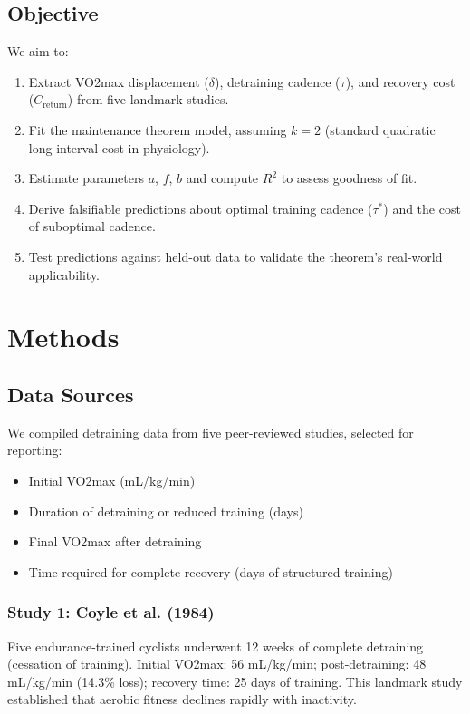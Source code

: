 \documentclass[12pt,a4paper]{article}
\begin{document}
\subsection{Objective}

We aim to:
\begin{enumerate}
\item Extract VO2max displacement ($\delta$), detraining cadence ($\tau$), and recovery cost ($C_{\text{return}}$) from five landmark studies.
\item Fit the maintenance theorem model, assuming $k=2$ (standard quadratic long-interval cost in physiology).
\item Estimate parameters $a$, $f$, $b$ and compute $R^2$ to assess goodness of fit.
\item Derive falsifiable predictions about optimal training cadence ($\tau^*$) and the cost of suboptimal cadence.
\item Test predictions against held-out data to validate the theorem's real-world applicability.
\end{enumerate}

\section{Methods}

\subsection{Data Sources}

We compiled detraining data from five peer-reviewed studies, selected for reporting:
\begin{itemize}
\item Initial VO2max (mL/kg/min)
\item Duration of detraining or reduced training (days)
\item Final VO2max after detraining
\item Time required for complete recovery (days of structured training)
\end{itemize}

\subsubsection{Study 1: Coyle et al. (1984)}
Five endurance-trained cyclists underwent 12 weeks of complete detraining (cessation of training). Initial VO2max: 56 mL/kg/min; post-detraining: 48 mL/kg/min (14.3\% loss); recovery time: 25 days of training. This landmark study established that aerobic fitness declines rapidly with inactivity.
\end{document}

